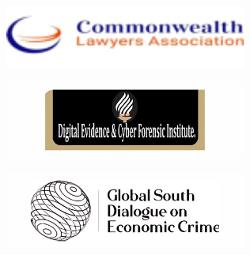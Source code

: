 \documentclass[
  letterpaper,
  DIV=11,
  numbers=noendperiod]{scrreprt}
\begin{document}
\begin{figure}
\begin{minipage}{0.50\linewidth}
\begin{figure}[H]
{}


\end{figure}%

\end{minipage}%
%
\begin{minipage}{0.50\linewidth}

\begin{figure}[H]

{\centering \includegraphics[width=3.125in,height=\textheight,keepaspectratio]{images/mous/commonwealth.png}

}


\end{figure}%

\end{minipage}%
\newline
\begin{minipage}{0.50\linewidth}

\begin{figure}[H]

{\centering \includegraphics[width=3.125in,height=\textheight,keepaspectratio]{images/mous/digital.png}

}


\end{figure}%

\end{minipage}%
%
\begin{minipage}{0.50\linewidth}

\begin{figure}[H]

{\centering \includegraphics[width=3.125in,height=\textheight,keepaspectratio]{images/mous/gsdec.png}

}
\end{figure}
\end{minipage}
\end{figure}
\end{document}
